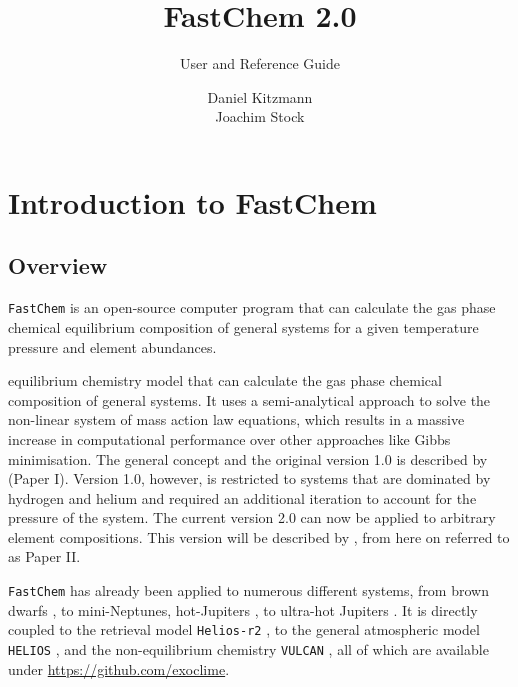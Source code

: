 \documentclass[numbers=noenddot]{fcmanual}
\author{Daniel Kitzmann\\
	    Joachim Stock
}
\title{FastChem 2.0}
\subtitle{User and Reference Guide}
\date{}
\newcommand{\fc}{\texttt{FastChem}\xspace}
\newcommand{\ttt}[1]{\texttt {#1}}
\begin{document}
\maketitle


\tableofcontents

\chapter{Introduction to FastChem}

\section{Overview}

\fc is an open-source computer program that can calculate the gas phase chemical equilibrium composition of general systems for a given temperature pressure and element abundances.


equilibrium chemistry model that can calculate the gas phase chemical composition of general systems. It uses a semi-analytical approach to solve the non-linear system of mass action law equations, which results in a massive increase in computational performance over other approaches like Gibbs minimisation. The general concept and the original version 1.0 is described by \citet{Stock2018MNRAS.479..865S} (Paper I). Version 1.0, however, is restricted to systems that are dominated by hydrogen and helium and required an additional iteration to account for the pressure of the system. The current version 2.0 can now be applied to arbitrary element compositions. This version will be described by \citet{Stock2020inprep}, from here on referred to as Paper II.

\fc has already been applied to numerous different systems, from brown dwarfs \citep{Kitzmann2020ApJ...890..174K}, to mini-Neptunes, hot-Jupiters \citep{Bourrier2020A&A...637A..36B}, to ultra-hot Jupiters \citep{Hoeijmakers2019A&A...627A.165H}. It is directly coupled to the retrieval model \ttt{Helios-r2} \citep{Kitzmann2020ApJ...890..174K}, to the general atmospheric model \ttt{HELIOS} \citep{Malik2019AJ....157..170M}, and the non-equilibrium chemistry \ttt{VULCAN} \citep{Tsai2018ApJ...862...31T}, all of which are available under \url{https://github.com/exoclime}.


%
\end{document}
